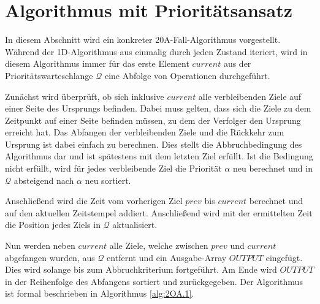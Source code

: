 \documentclass[german,version-2019-11]{uzl-thesis}
\begin{document}
\section{Algorithmus mit Prioritätsansatz}

In diesem Abschnitt wird ein konkreter 20A-Fall-Algorithmus vorgestellt. Während der 1D-Algorithmus aus \cite{helvig} einmalig durch jeden Zustand iteriert, wird in diesem Algorithmus immer für das erste Element $current$ aus der Prioritätswarteschlange $\mathcal{Q}$ eine Abfolge von Operationen durchgeführt. 

Zunächst wird überprüft, ob sich inklusive $current$ alle verbleibenden Ziele auf einer Seite des Ursprungs befinden. Dabei muss gelten, dass sich die Ziele zu dem Zeitpunkt auf einer Seite befinden müssen, zu dem der Verfolger den Ursprung erreicht hat. Das Abfangen der verbleibenden Ziele und die Rückkehr zum Ursprung ist dabei einfach zu berechnen. Dies stellt die Abbruchbedingung des Algorithmus dar und ist spätestens mit dem letzten Ziel erfüllt. Ist die Bedingung nicht erfüllt, wird für jedes verbleibende Ziel die Priorität $\alpha$ neu berechnet und in $\mathcal{Q}$ absteigend nach $\alpha$ neu sortiert. 

Anschließend wird die Zeit vom vorherigen Ziel $prev$ bis $current$ berechnet und auf den aktuellen Zeitstempel addiert. Anschließend wird mit der ermittelten Zeit die Position jedes Ziels in $\mathcal{Q}$ aktualisiert.

Nun werden neben $current$ alle Ziele, welche zwischen $prev$ und $current$ abgefangen wurden, aus $\mathcal{Q}$ entfernt und ein Ausgabe-Array $OUTPUT$ eingefügt. Dies wird solange bis zum Abbruchkriterium fortgeführt. Am Ende wird $OUTPUT$ in der Reihenfolge des Abfangens sortiert und zurückgegeben. Der Algorithmus ist formal beschrieben in Algorithmus \ref{alg:2OA.1}.
\end{document}
